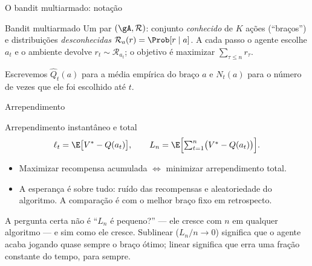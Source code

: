 \documentclass[aspectratio=169, 11pt]{beamer}
\newcommand{\Qh}{\widehat{Q}}
\newcommand{\Dist}{\mathcal{R}}
\begin{document}
\begin{frame}{O bandit multiarmado: notação}
  \begin{defbox}{Bandit multiarmado}
    {\small Um par $(\gA,\Dist)$: conjunto \emph{conhecido} de $K$ ações
    (``braços'') e distribuições \emph{desconhecidas}
    $\Dist_a(r) = \Prob[r\mid a]$. A cada passo o agente escolhe $a_t$ e o
    ambiente devolve $r_t \sim \Dist_{a_t}$; o objetivo é maximizar
    $\sum_{\tau\le n} r_\tau$.}
  \end{defbox}

  \begin{center}
  \end{center}

  {\small Escrevemos $\Qh_t(a)$ para a média empírica do braço $a$ e $N_t(a)$
  para o número de vezes que ele foi escolhido até $t$.}
\end{frame}

\begin{frame}{Arrependimento}
  \begin{defbox}{Arrependimento instantâneo e total}
    \[
      \ell_t = \E\bigl[V^{*}-Q(a_t)\bigr],
      \qquad
      L_n = \E\Bigl[\textstyle\sum_{t=1}^{n}\bigl(V^{*}-Q(a_t)\bigr)\Bigr].
    \]
  \end{defbox}

  \begin{itemize}\small
    \item Maximizar recompensa acumulada $\iff$ minimizar arrependimento total.
    \item A esperança é sobre tudo: ruído das recompensas e aleatoriedade do
          algoritmo. A comparação é com o \alert{melhor braço fixo em
          retrospecto}.
  \end{itemize}

  \begin{ideiabox}
    A pergunta certa não é ``$L_n$ é pequeno?'' --- ele cresce com $n$ em
    qualquer algoritmo --- e sim \alert{como} ele cresce. Sublinear
    ($L_n/n\to0$) significa que o agente acaba jogando quase sempre o braço
    ótimo; linear significa que erra uma fração constante do tempo, para sempre.
  \end{ideiabox}
\end{frame}
\end{document}

